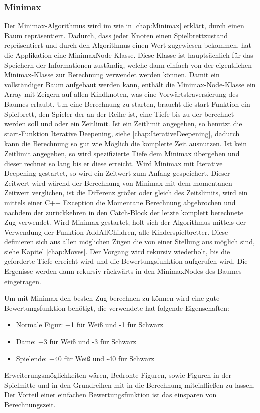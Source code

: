 \documentclass[12pt,a4paper,bibliography=totocnumbered,listof=totocnumbered]{article}
\begin{document}
\subsubsection{Minimax}
Der Minimax-Algorithmus wird im wie in \ref{chap:Minimax} erklärt, durch einen Baum repräsentiert. Dadurch, dass jeder Knoten einen Spielbrettzustand
repräsentiert und durch den Algorithmus einen Wert zugewiesen bekommen, hat die Applikation eine MinimaxNode-Klasse.
Diese Klasse ist hauptsächlich für das Speichern der Informationen zuständig, welche dann einfach von der eigentlichen Minimax-Klasse zur Berechnung
verwendet werden können. Damit ein vollständiger Baum aufgebaut werden kann, enthält die Minimax-Node-Klasse ein Array mit Zeigern auf allen 
Kindknoten, was eine Vorwärtstraversierung des Baumes erlaubt. 
Um eine Berechnung zu starten, braucht die start-Funktion ein Spielbrett, den Spieler der an der Reihe ist, eine
Tiefe bis zu der berechnet werden soll und oder ein Zeitlimit. Ist ein Zeitlimit angegeben, so benutzt die start-Funktion Iterative Deepening, siehe
\ref{chap:IterativeDeepening}, dadurch kann die Berechnung so gut wie Möglich die komplette Zeit ausnutzen. Ist kein Zeitlimit angegeben, 
so wird spezifizierte Tiefe dem Minimax übergeben und dieser rechnet so lang bis er diese erreicht. Wird Minimax mit Iterative Deepening gestartet, so
wird ein Zeitwert zum Anfang gespeichert. Dieser Zeitwert wird wärend der Berechnung von Minimax mit dem momentanen Zeitwert verglichen, ist die 
Differenz größer oder gleich des Zeitslimits, wird ein mittels einer C++ Exception die Momentane Berechnung abgebrochen und nachdem der zurückkehren in 
den Catch-Block der letzte komplett berechnete Zug verwendet. 
Wird Minimax gestartet, holt sich der Algorithmus mittels der Verwendung der Funktion AddAllChildren, alle Kinderspielbretter. Diese 
definieren sich aus allen möglichen Zügen die von einer Stellung aus möglich sind, siehe Kapitel \ref{chap:Moves}. Der Vorgang wird 
rekursiv wiederholt, bis die geforderte Tiefe erreicht wird und die Bewertungsfunktion aufgerufen wird. Die Ergenisse werden dann rekursiv rückwärts in 
den MinimaxNodes des Baumes eingetragen.

Um mit Minimax den besten Zug berechnen zu können wird eine gute Bewertungsfunktion 
benötigt, die verwendete hat folgende Eigenschaften:
\begin{itemize}
    \item Normale Figur: +1 für Weiß und -1 für Schwarz
    \item Dame: +3 für Weiß und -3 für Schwarz
    \item Spielende: +40 für Weiß und -40 für Schwarz
\end{itemize} 
Erweiterungsmöglichkeiten wären, Bedrohte Figuren, sowie Figuren in der Spielmitte und in den Grundreihen mit in die Berechnung miteinfließen zu lassen.
Der Vorteil einer einfachen Bewertungsfunktion ist das einsparen von Berechnungszeit.
\end{document}
